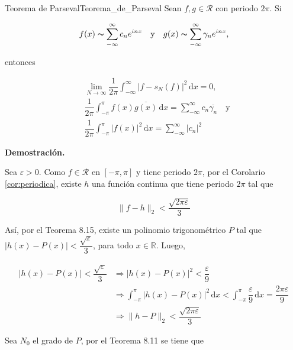 \documentclass[fleqn]{article}
\newcounter{teore}
\newenvironment{teorema}[2]{\begin{teo}[breakable, pad at break = 5mm, leftrule = 0.7mm, rightrule = 0.7mm, right = 2mm, left = 2mm, enlarge bottom finally by = 3mm, fontupper = \setlength{\parskip}{2mm}, fontlower = \setlength{\parskip}{2mm}]{#1}{#2}}{\end{teo}}
\newcommand{\real}{\mathbb{R}}
\newcommand{\intg}[4]{\int_{#1}^{#2} \!\! #3 \, \mathrm{d} #4}
\begin{document}
	\begin{teorema}{Teorema de Parseval}{Teorema_de_Parseval}
		Sean $ f,g \in \mathcal{R} $ con periodo $ 2 \pi $. Si 

		\begin{equation*}
			f(x) \thicksim \sum_{-\infty}^{\infty} c_n e^{inx} \quad \mbox{y} \quad g(x) \thicksim \sum_{-\infty}^{\infty} \gamma_n e^{inx},
		\end{equation*}

		entonces

		\begin{align*}
			& \lim_{N \to \infty} \dfrac{1}{2\pi} \intg{-\infty}{\infty}{\bigl\lvert f - s_N(f) \bigr\rvert^2}{x} = 0, \\
			& \dfrac{1}{2\pi} \intg{-\pi}{\pi}{f(x) \overline{g(x)}}{x} = \sum_{-\infty}^{\infty} c_n \overline{\gamma_n} \quad \mbox{y} \\
			& \dfrac{1}{2\pi} \intg{-\pi}{\pi}{\bigl\lvert f(x) \bigr\rvert^2}{x} = \sum_{-\infty}^{\infty} \lvert c_n \rvert^2
		\end{align*}

		\tcblower

		\textbf{Demostración.}

		Sea $ \varepsilon > 0 $. Como $ f \in \mathcal{R} $ en $ [-\pi, \pi] $ y tiene periodo $ 2 \pi $, por el Corolario \ref{cor:periodica}, existe $ h $ una función continua que tiene periodo $ 2 \pi $ tal que 
		
		\begin{equation}
			\lVert f - h \rVert_2 < \dfrac{\sqrt{2 \pi \varepsilon}}{3}
			\label{desigualdad1}
		\end{equation}
		
		Así, por el Teorema 8.15, existe un polinomio trigonométrico $ P $ tal que $ \lvert h(x) - P(x) \rvert < \dfrac{\sqrt{\varepsilon}}{3} $, para todo $ x \in \real $. Luego,

		\begin{align*}
			\lvert h(x) - P(x) \rvert < \dfrac{\sqrt{\varepsilon}}{3} &\Longrightarrow \lvert h(x) - P(x) \rvert^2 < \dfrac{\varepsilon}{9} \\
			&\Longrightarrow \intg{-\pi}{\pi}{\lvert h(x) - P(x) \rvert^2}{x} < \intg{-\pi}{\pi}{\dfrac{\varepsilon}{9}}{x} = \dfrac{2 \pi \varepsilon}{9} \\
			&\Longrightarrow \lVert h - P \rVert_2 < \dfrac{\sqrt{2 \pi \varepsilon}}{3}
		\end{align*}

		Sea $ N_0 $ el grado de $ P $, por el Teorema 8.11 se tiene que 


\end{teorema}
\end{document}
